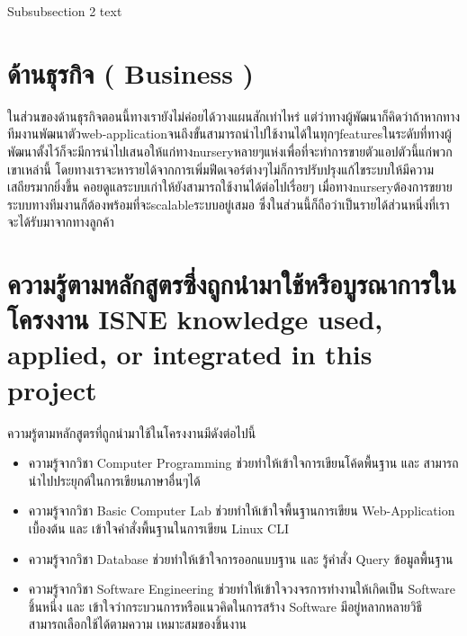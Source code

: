 


Subsubsection 2 text

\section{ ด้านธุรกิจ ( Business )
}
ในส่วนของด้านธุรกิจตอนนี้ทางเรายังไม่ค่อยได้วางแผนสักเท่าไหร่ แต่ว่าทางผู้พัฒนาก็คิดว่าถ้าหากทางทีมงานพัฒนาตัวweb-applicationจนถึงขั้นสามารถนำไปใช้งานได้ในทุกๆfeaturesในระดับที่ทางผู้พัฒนาตั้งไว้ก็จะมีการนำไปเสนอให้แก่ทางnurseryหลายๆแห่งเพื่อที่จะทำการขายตัวแอปตัวนี้แก่พวกเขาเหล่านี้ โดยทางเราจะหารายได้จากการเพิ่มฟีดเจอร์ต่างๆไม่ก็การปรับปรุงแก้ไขระบบให้มีความเสถียรมากยิ่งขึ้น คอยดูแลระบบเก่าให้ยังสามารถใช้งานได้ต่อไปเรื่อยๆ 	เมื่อทางnurseryต้องการขยายระบบทางทีมงานก็ต้องพร้อมที่จะscalableระบบอยู่เสมอ ซึ่งในส่วนนี้ก็ถือว่าเป็นรายได้ส่วนหนึ่งที่เราจะได้รับมาจากทางลูกค้า

\section{\ifcpe%
ความรู้ตามหลักสูตรซึ่งถูกนำมาใช้หรือบูรณาการในโครงงาน
\else%
ISNE knowledge used, applied, or integrated in this project
\fi
}

ความรู้ตามหลักสูตรที่ถูกนำมาใช้ในโครงงานมีดังต่อไปนี้
\begin{itemize}
  \item ความรู้จากวิชา Computer Programming ช่วยทำให้เข้าใจการเขียนโค้ดพื้นฐาน และ สามารถนำไปประยุกต์ในการเขียนภาษาอื่นๆได้
  \item ความรู้จากวิชา Basic Computer Lab ช่วยทำให้เข้าใจพื้นฐานการเขียน Web-Application เบื้องต้น และ เข้าใจคำสั่งพื้นฐานในการเขียน Linux CLI
  \item ความรู้จากวิชา Database ช่วยทำให้เข้าใจการออกแบบฐาน และ รู้คำสั่ง Query ข้อมูลพื้นฐาน
  \item ความรู้จากวิชา Software Engineering ช่วยทำให้เข้าใจวงจรการทำงานให้เกิดเป็น Software ชิ้นหนึ่ง และ เข้าใจว่ากระบวนการหรือแนวคิดในการสร้าง Software มีอยู่หลากหลายวิธี สามารถเลือกใช้ได้ตามความ
  เหมาะสมของชิ้นงาน 
  
\end{itemize}


